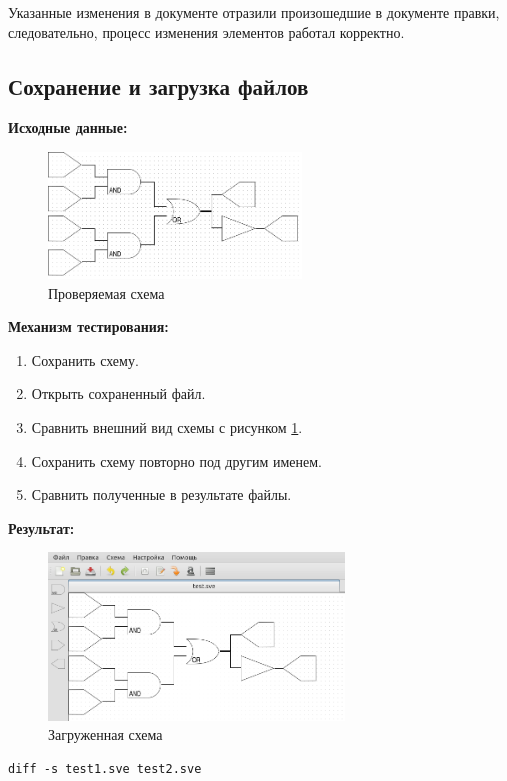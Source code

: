 Указанные изменения в документе отразили произошедшие в документе правки, следовательно, процесс изменения элементов работал корректно.

\subsection{Сохранение и загрузка файлов}
\textbf{Исходные данные:}
\begin{figure}[H]
  \centering
  \includegraphics[width=0.6\textwidth]{gui/test/source.png}
  \caption{Проверяемая схема}
  \label{fig:source-test-scheme}
\end{figure}

\textbf{Механизм тестирования:}
\begin{enumerate}
  \item Сохранить схему.
  \item Открыть сохраненный файл.
  \item Сравнить внешний вид схемы с рисунком \ref{fig:source-test-scheme}.
  \item Сохранить схему повторно под другим именем.
  \item Сравнить полученные в результате файлы.
\end{enumerate}

\textbf{Результат:}
\begin{figure}[H]
  \centering
  \includegraphics[width=0.7\textwidth]{gui/test/load-res.png}
  \caption{Загруженная схема}
  \label{fig:load-test-scheme}
\end{figure}

\begin{lstlisting}
diff -s test1.sve test2.sve
\end{lstlisting}

